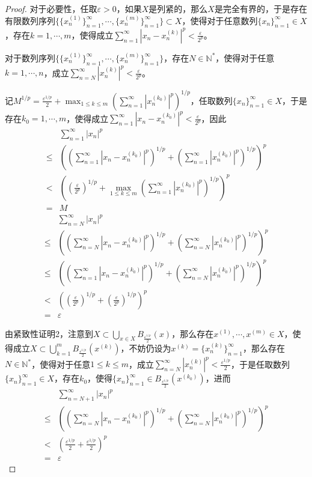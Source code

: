 \documentclass[lang = cn, scheme = chinese, 10pt]{elegantbook}
\newcommand{\N}{\mathbb{N}}  %
\newcommand{\sub}{\subset}   %
\begin{document}
\begin{proof}
	对于必要性，任取$\varepsilon>0$，如果$X$是列紧的，那么$X$是完全有界的，于是存在有限数列序列$\{ \{x_n^{(1)}\}_{n=1}^{\infty},\cdots,\{x_n^{(m)}\}_{n=1}^{\infty} \}\sub X$，使得对于任意数列$\{x_n\}_{n=1}^{\infty}\in X$，存在$k=1,\cdots,m$，使得成立$\displaystyle\sum_{n=1}^{\infty}|x_n-x_n^{(k)}|^p<\frac{\varepsilon}{2^p}$。
	
	对于数列序列$\{ \{x_n^{(1)}\}_{n=1}^{\infty},\cdots,\{x_n^{(m)}\}_{n=1}^{\infty} \}$，存在$N\in\N^*$，使得对于任意$k=1,\cdots,n$，成立$\displaystyle\sum_{n=N}^{\infty}|x_n^{(k)}|^p<\frac{\varepsilon}{2^p}$。
	
	记$\displaystyle M^{1/p}=\frac{\varepsilon^{1/p}}{2}+\max_{1\le k\le m}\left(\sum_{n=1}^{\infty}|x_n^{(k_0)}|^p\right)^{1/p}$，任取数列$\{x_n\}_{n=1}^{\infty}\in X$，于是存在$k_0=1,\cdots,m$，使得成立$\displaystyle\sum_{n=1}^{\infty}|x_n-x_n^{(k_0)}|^p<\frac{\varepsilon}{2^p}$，因此
	\nonumber\begin{align}
		&\sum_{n=1}^{\infty}|x_n|^p\\
		\le &\left(\left(\sum_{n=1}^{\infty}|x_n-x_n^{(k_0)}|^p\right)^{1/p}+\left(\sum_{n=1}^{\infty}|x_n^{(k_0)}|^p\right)^{1/p}\right)^p\\
		<&\left(\left(\frac{\varepsilon}{2^p}\right)^{1/p}+\max_{1\le k\le m}\left(\sum_{n=1}^{\infty}|x_n^{(k_0)}|^p\right)^{1/p}\right)^p\\
		=&M
	\end{align}
	\nonumber\begin{align}
		&\sum_{n=N}^{\infty}|x_n|^p\\
		\le &\left(\left(\sum_{n=N}^{\infty}|x_n-x_n^{(k_0)}|^p\right)^{1/p}+\left(\sum_{n=N}^{\infty}|x_n^{(k_0)}|^p\right)^{1/p}\right)^p\\
		\le &\left(\left(\sum_{n=1}^{\infty}|x_n-x_n^{(k_0)}|^p\right)^{1/p}+\left(\sum_{n=N}^{\infty}|x_n^{(k_0)}|^p\right)^{1/p}\right)^p\\
		<&\left(\left(\frac{\varepsilon}{2^p}\right)^{1/p}+\left(\frac{\varepsilon}{2^p}\right)^{1/p}\right)^p\\
		=&\varepsilon
	\end{align}
	
	由紧致性证明2，注意到$\displaystyle X\sub\bigcup_{x\in X}B_{\frac{\varepsilon^{1/p}}{2}}(x)$，那么存在$x^{(1)},\cdots,x^{(m)}\in X$，使得成立$\displaystyle X\sub\bigcup_{k=1}^{m}B_{\frac{\varepsilon^{1/p}}{2}}(x^{(k)})$，不妨仍设为$x^{(k)}=\{x_n^{(k)}\}_{n=1}^{\infty}$，那么存在$N\in\N^*$，使得对于任意$1\le k\le m$，成立$\displaystyle\sum_{n=N}^{\infty}|x_n^{(k)}|^p<\frac{\varepsilon^{1/p}}{2}$，于是任取数列$\{x_n\}_{n=1}^{\infty}\in X$，存在$k_0$，使得$\{x_n\}_{n=1}^{\infty}\in B_{\frac{\varepsilon^{1/p}}{2}}(x^{(k_0)})$，进而
	\nonumber\begin{align}
		&\sum_{n=N+1}^{\infty}|x_n|^p\\
		\le &\left(\left(\sum_{n=N}^{\infty}|x_n-x_n^{(k_0)}|^p\right)^{1/p}+\left(\sum_{n=N}^{\infty}|x_n^{(k_0)}|^p\right)^{1/p}\right)^p\\
		<&\left(\frac{\varepsilon^{1/p}}{2}+\frac{\varepsilon^{1/p}}{2}\right)^p\\
		=&\varepsilon
	\end{align}
	

\end{proof}
\end{document}
